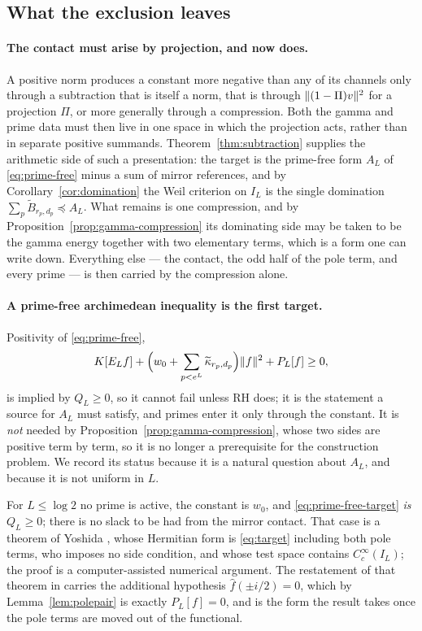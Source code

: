 \subsection{What the exclusion leaves}\label{subsec:leaves}
\paragraph{The contact must arise by projection, and now does.}
A positive norm produces a constant more negative than any of its channels
only through a subtraction that is itself a norm, that is through
$\lVert (1-\Pi)v\rVert^2$ for a projection $\Pi$, or more generally through a
compression. Both the gamma and prime data must then live in one space in
which the projection acts, rather than in separate positive summands.
Theorem~\ref{thm:subtraction} supplies the arithmetic side of such a
presentation: the target is the prime-free form $A_L$ of
\eqref{eq:prime-free} minus a sum of mirror references, and by
Corollary~\ref{cor:domination} the Weil criterion on $I_L$ is the single
domination $\sum_p\widetilde B_{r_p,d_p}\preceq A_L$. What remains is one
compression, and by Proposition~\ref{prop:gamma-compression} its dominating
side may be taken to be the gamma energy together with two elementary terms,
which is a form one can write down. Everything else --- the contact, the odd
half of the pole term, and every prime --- is then carried by the compression
alone.

\paragraph{A prime-free archimedean inequality is the first target.}
Positivity of \eqref{eq:prime-free},
\begin{equation}\label{eq:prime-free-target}
 K[E_Lf]+\Big(w_0+\sum_{p<e^L}\widetilde\kappa_{r_p,d_p}\Big)\lVert f\rVert^2
 +P_L[f]\geq0,
\end{equation}
is implied by $Q_L\geq0$, so it cannot fail unless RH does; it is the
statement a source for $A_L$ must satisfy, and primes enter it only through
the constant. It is \emph{not} needed by
Proposition~\ref{prop:gamma-compression}, whose two sides are positive term by
term, so it is no longer a prerequisite for the construction problem. We record
its status because it is a natural question about $A_L$, and because it is not
uniform in $L$.

For $L\leq\log2$ no prime is active, the constant is $w_0$, and
\eqref{eq:prime-free-target} \emph{is} $Q_L\geq0$; there is no slack to be had
from the mirror contact. That case is a theorem of Yoshida
\cite[Theorem 1]{Yoshida}, whose Hermitian form is \eqref{eq:target} including
both pole terms, who imposes no side condition, and whose test space contains
$C_c^\infty(I_L)$; the proof is a computer-assisted numerical argument. The
restatement of that theorem in \cite{CCWeil} carries the additional hypothesis
$\widehat f(\pm i/2)=0$, which by Lemma~\ref{lem:polepair} is exactly
$P_L[f]=0$, and is the form the result takes once the pole terms are moved out
of the functional.

